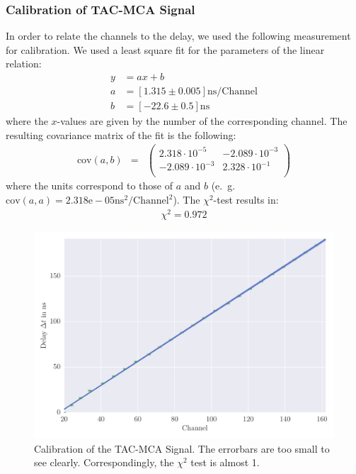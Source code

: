 \subsubsection{Calibration of TAC-MCA Signal}
\label{subs:calib_TAC}
In order to relate the channels to the delay, we used the following
measurement for calibration. We used a least square fit for the parameters
of the linear relation:
\begin{align}
    \label{eq:coeff}
    y &= ax + b \\
    a &= \left[ 1.315 \pm 0.005 \right] \mathrm{ns} / \mathrm{Channel}\\
    b &= \left[ -22.6 \pm 0.5 \right]\mathrm{ns} 
\end{align}
where the $x$-values are given by the number of the corresponding channel. 
The resulting covariance matrix of the fit is the following:
\begin{align}
    \label{eq:cov}
    \mathrm{cov}(a, b) &=& 
    \begin{pmatrix}
        2.318 \cdot 10^{-5} &-2.089\cdot 10^{-3}\\
        -2.089\cdot 10^{-3}&2.328\cdot 10^{-1}\\
    \end{pmatrix}
\end{align}
where the units correspond to those of $a$ and $b$ 
(e.~g. $\mathrm{cov}(a,a) = 2.318\mathrm{e}-05 \mathrm{ns^2} / \mathrm{Channel}^2$).
The $\chi^2$-test results in:
\begin{align}
    \label{eq:}
   \chi^2 = 0.972
\end{align}

\label{sub:calibration_of_tac_mca_signal}
\begin{figure}[htpb]
    \centering
    \includegraphics[width=1.0\linewidth]{analysis/figures/plot7}
    \caption{Calibration of the TAC-MCA Signal. The errorbars are too small
        to see clearly. Correspondingly, the $\chi^2$ test is almost 1.}
    \label{fig:plot7}
\end{figure}


